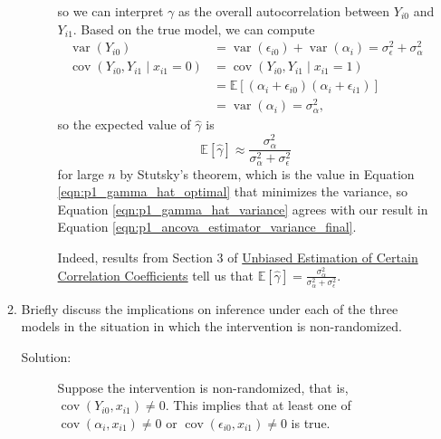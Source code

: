 \documentclass[letterpaper,11pt]{article}
\begin{document}
\begin{enumerate}
\begin{enumerate}
\begin{description}
      so we can interpret $\gamma$ as the overall autocorrelation between
      $Y_{i0}$ and $Y_{i1}$. Based on the true model, we can compute
      \begin{align*}
        \operatorname{var}\left(Y_{i0}\right)
        &= \operatorname{var}\left(\epsilon_{i0}\right) + \operatorname{var}\left(\alpha_i\right)
        = \sigma_\epsilon^2 + \sigma_\alpha^2 \\
        \operatorname{cov}\left(Y_{i0}, Y_{i1} \mid x_{i1} = 0\right)
        &= \operatorname{cov}\left(Y_{i0}, Y_{i1} \mid x_{i1} = 1\right) \\
        &= \mathbb{E}\left[\left(\alpha_i + \epsilon_{i0}\right)\left(
          \alpha_i + \epsilon_{i1}
          \right)\right] \\
        &= \operatorname{var}\left(\alpha_i\right) = \sigma^2_\alpha,
      \end{align*}
      so the expected value of $\hat{\gamma}$ is
      \begin{equation}
        \mathbb{E}\left[\hat{\gamma}\right] \approx \frac{\sigma^2_\alpha}{\sigma^2_\alpha + \sigma^2_\epsilon}
        \label{eqn:p1_gamma_hat_expected}     
      \end{equation}
      for large $n$ by Stutsky's theorem, which is the value in Equation
      \ref{eqn:p1_gamma_hat_optimal} that minimizes the variance, so Equation
      \ref{eqn:p1_gamma_hat_variance} agrees with our result in Equation
      \ref{eqn:p1_ancova_estimator_variance_final}.

      Indeed, results from Section 3 of
      \href{https://projecteuclid.org/euclid.aoms/1177706717}{Unbiased
        Estimation of Certain Correlation Coefficients} tell us that
      $\mathbb{E}\left[\hat{\gamma}\right] =
      \frac{\sigma_\alpha^2}{\sigma_\alpha^2 + \sigma_\epsilon^2}$.
    \end{description}
  \item Briefly discuss the implications on inference under each of the three
    models in the situation in which the intervention is non-randomized.
    \begin{description}
    \item[Solution:] Suppose the intervention is non-randomized, that is,
      $\operatorname{cov}\left(Y_{i0}, x_{i1}\right) \neq 0$. This implies that
      at least one of $\operatorname{cov}\left(\alpha_i, x_{i1}\right) \neq 0$
      or $\operatorname{cov}\left(\epsilon_{i0}, x_{i1}\right) \neq 0$ is true.


\end{description}
\end{enumerate}
\end{enumerate}
\end{document}
